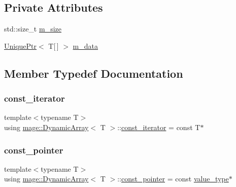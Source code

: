 \subsection*{Private Attributes}
\begin{DoxyCompactItemize}
\item 
std\+::size\+\_\+t \mbox{\hyperlink{classmage_1_1_dynamic_array_a277e5d7aba77f108d7369f080eb36f60}{m\+\_\+size}}
\item 
\mbox{\hyperlink{namespacemage_a3316d7143a973e37adf1110f2e80ca31}{Unique\+Ptr}}$<$ T\mbox{[}$\,$\mbox{]} $>$ \mbox{\hyperlink{classmage_1_1_dynamic_array_a4b2a43904083dc2d400ff6fa7afc38dd}{m\+\_\+data}}
\end{DoxyCompactItemize}


\subsection{Member Typedef Documentation}
\mbox{\label{classmage_1_1_dynamic_array_ad27aa1273eb102bbd596a13a00159001}} 
\subsubsection{\texorpdfstring{const\+\_\+iterator}{const\_iterator}}
{\footnotesize\ttfamily template$<$typename T$>$ \\
using \mbox{\hyperlink{classmage_1_1_dynamic_array}{mage\+::\+Dynamic\+Array}}$<$ T $>$\+::\mbox{\hyperlink{classmage_1_1_dynamic_array_ad27aa1273eb102bbd596a13a00159001}{const\+\_\+iterator}} =  const T$\ast$}

\mbox{\label{classmage_1_1_dynamic_array_a875dce615abb0b5c6989167b3db40ef4}} 
\subsubsection{\texorpdfstring{const\+\_\+pointer}{const\_pointer}}
{\footnotesize\ttfamily template$<$typename T$>$ \\
using \mbox{\hyperlink{classmage_1_1_dynamic_array}{mage\+::\+Dynamic\+Array}}$<$ T $>$\+::\mbox{\hyperlink{classmage_1_1_dynamic_array_a875dce615abb0b5c6989167b3db40ef4}{const\+\_\+pointer}} =  const \mbox{\hyperlink{classmage_1_1_dynamic_array_a1f26711f844168c39991df0d5a340178}{value\+\_\+type}}$\ast$}


